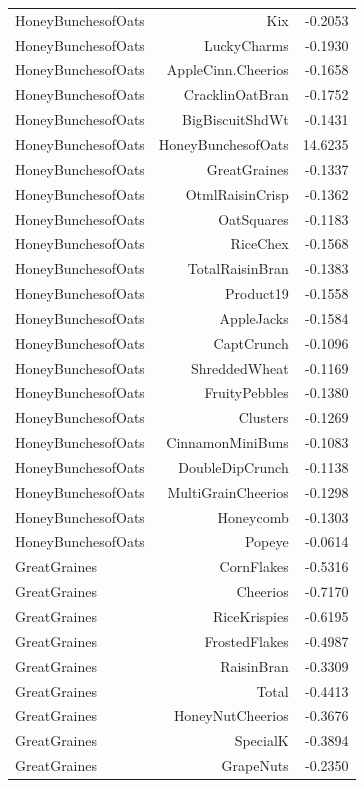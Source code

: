 \begin{longtable}{@{}lrr@{}}
HoneyBunchesofOats & Kix & -0.2053 \\
HoneyBunchesofOats & LuckyCharms & -0.1930 \\
HoneyBunchesofOats & AppleCinn.Cheerios & -0.1658 \\
HoneyBunchesofOats & CracklinOatBran & -0.1752 \\
HoneyBunchesofOats & BigBiscuitShdWt & -0.1431 \\
HoneyBunchesofOats & HoneyBunchesofOats & 14.6235 \\
HoneyBunchesofOats & GreatGraines & -0.1337 \\
HoneyBunchesofOats & OtmlRaisinCrisp & -0.1362 \\
HoneyBunchesofOats & OatSquares & -0.1183 \\
HoneyBunchesofOats & RiceChex & -0.1568 \\
HoneyBunchesofOats & TotalRaisinBran & -0.1383 \\
HoneyBunchesofOats & Product19 & -0.1558 \\
HoneyBunchesofOats & AppleJacks & -0.1584 \\
HoneyBunchesofOats & CaptCrunch & -0.1096 \\
HoneyBunchesofOats & ShreddedWheat & -0.1169 \\
HoneyBunchesofOats & FruityPebbles & -0.1380 \\
HoneyBunchesofOats & Clusters & -0.1269 \\
HoneyBunchesofOats & CinnamonMiniBuns & -0.1083 \\
HoneyBunchesofOats & DoubleDipCrunch & -0.1138 \\
HoneyBunchesofOats & MultiGrainCheerios & -0.1298 \\
HoneyBunchesofOats & Honeycomb & -0.1303 \\
HoneyBunchesofOats & Popeye & -0.0614 \\
GreatGraines & CornFlakes & -0.5316 \\
GreatGraines & Cheerios & -0.7170 \\
GreatGraines & RiceKrispies & -0.6195 \\
GreatGraines & FrostedFlakes & -0.4987 \\
GreatGraines & RaisinBran & -0.3309 \\
GreatGraines & Total & -0.4413 \\
GreatGraines & HoneyNutCheerios & -0.3676 \\
GreatGraines & SpecialK & -0.3894 \\
GreatGraines & GrapeNuts & -0.2350 \\

\end{longtable}
